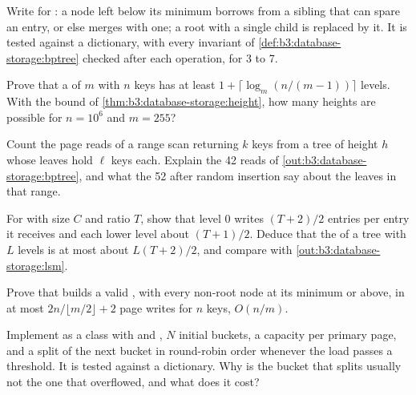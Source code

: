 \begin{exercise}[$\star\star$]\label{exo:b3:database-storage:6}
Write  for : a node left below its minimum borrows from a sibling that can spare an entry, or else merges with one; a root with a single child is replaced by it. It is tested against a dictionary, with every invariant of \cref{def:b3:database-storage:bptree} checked after each operation, for  3 to 7.
\end{exercise}

\begin{exercise}[$\star\star$]\label{exo:b3:database-storage:7}
Prove that a  of  $m$ with $n$ keys has at least $1 + \lceil \log_m (n/(m-1)) \rceil$ levels. With the bound of \cref{thm:b3:database-storage:height}, how many heights are possible for $n = 10^6$ and $m = 255$?
\end{exercise}

\begin{exercise}[$\star\star$]\label{exo:b3:database-storage:8}
Count the page reads of a range scan returning $k$ keys from a tree of height $h$ whose leaves hold $\ell$ keys each. Explain the 42 reads of \cref{out:b3:database-storage:bptree}, and what the 52 after random insertion say about the leaves in that range.
\end{exercise}

\begin{exercise}[$\star\star$]\label{exo:b3:database-storage:9}
For  with  size $C$ and ratio $T$, show that level 0 writes $(T+2)/2$ entries per entry it receives and each lower level about $(T+1)/2$. Deduce that the  of a tree with $L$ levels is at most about $L(T+2)/2$, and compare with \cref{out:b3:database-storage:lsm}.
\end{exercise}

\begin{exercise}[$\star\star\star$]\label{exo:b3:database-storage:10}
Prove that  builds a valid , with every non-root node at its minimum or above, in at most $2n/\lfloor m/2 \rfloor + 2$ page writes for $n$ keys, $O(n/m)$.
\end{exercise}

\begin{exercise}[$\star\star\star$]\label{exo:b3:database-storage:11}
Implement  as a class  with  and , $N$ initial buckets, a capacity per primary page, and a split of the next bucket in round-robin order whenever the load passes a threshold. It is tested against a dictionary. Why is the bucket that splits usually not the one that overflowed, and what does it cost?
\end{exercise}

